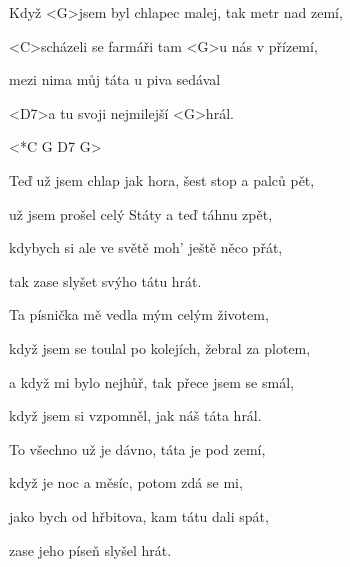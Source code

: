 

\zs
Když <G>jsem byl chlapec malej, tak metr nad zemí,

<C>scházeli se farmáři tam <G>u nás v přízemí,

mezi nima můj táta u piva sedával

<D7>a tu svoji nejmilejší <G>hrál.
\ks

<*C G D7 G>

\zs
Teď už jsem chlap jak hora, šest stop a palců pět,

už jsem prošel celý Státy a teď táhnu zpět,

kdybych si ale ve světě moh' ještě něco přát,

tak zase slyšet svýho tátu hrát.
\ks

\zs
Ta písnička mě vedla mým celým životem,

když jsem se toulal po kolejích, žebral za plotem,

a když mi bylo nejhůř, tak přece jsem se smál,

když jsem si vzpomněl, jak náš táta hrál.
\ks

\zs
To všechno už je dávno, táta je pod zemí,

když je noc a měsíc, potom zdá se mi,

jako bych od hřbitova, kam tátu dali spát,

zase jeho píseň slyšel hrát.
\ks

\kp
